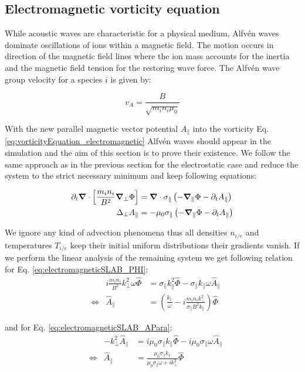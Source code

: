 \subsection{Electromagnetic vorticity equation}
While acoustic waves are characteristic for a physical medium, Alfvén waves dominate oscillations of ions within a magnetic field. The motion occurs in direction of the magnetic field lines where the ion mass accounts for the inertia and the magnetic field tension for the restoring wave force. The Alfvén wave group velocity for a species $i$ is given by:

\begin{equation}
	v_A = \frac{B}{\sqrt{m_in_i\mu_0}} \label{eq:AlfvenGroupVelocity}
\end{equation}

With the new parallel magnetic vector potential $A_\parallel$ into the vorticity Eq. \ref{eq:vorticityEquation_electromagnetic} Alfvén waves should appear in the simulation and the aim of this section is to prove their existence. We follow the same approach as in the previous section for the electrostatic case and reduce the system to the strict necessary minimum and keep following equations: 

\begin{align}
	\partial_t\grad\cdot\left[\frac{m_in_i}{B^2}\grad_\perp\Phi\right] &= \grad\cdot\sigma_\parallel\left(-\grad_\parallel\Phi-\partial_tA_\parallel\right) \label{eq:electromagneticSLAB_PHI} \\
	\Delta_{\perp}A_\parallel &= -\mu_0\sigma_\parallel\left(-\grad_\parallel\Phi-\partial_tA_\parallel\right) \label{eq:electromagneticSLAB_APara}
\end{align}

We ignore any kind of advection phenomena thus all densities $n_{i/e}$ and temperatures $T_{i/e}$ keep their initial uniform distributions their gradients vanish. If we perform the linear analysis of the remaining system we get following relation for Eq. \ref{eq:electromagneticSLAB_PHI}:
\begin{align*}
	&&i\frac{m_in_i}{B^2}k_\perp^2\omega\hat{\Phi} &= \sigma_\parallel k_\parallel^2\hat{\Phi}-\sigma_\parallel k_\parallel\omega\hat{A}_\parallel \\
	&\Leftrightarrow& \hat{A}_\parallel &= \left(\frac{k_\parallel}{\omega} - i\frac{m_in_ik_\perp^2}{\sigma_\parallel B^2k_\parallel}\right)\hat{\Phi}
\end{align*}

and for Eq. \ref{eq:electromagneticSLAB_APara}:
\begin{align*}
	&&-k_\perp^2\hat{A}_\parallel &= i\mu_0\sigma_\parallel k_\parallel\hat{\Phi} - i\mu_0\sigma_\parallel\omega\hat{A}_\parallel \\
	&\Leftrightarrow&\hat{A}_\parallel &= \frac{\mu_0\sigma_\parallel k_\parallel}{\mu_0\sigma_\parallel\omega + i k_\perp^2}\hat{\Phi}
\end{align*}

